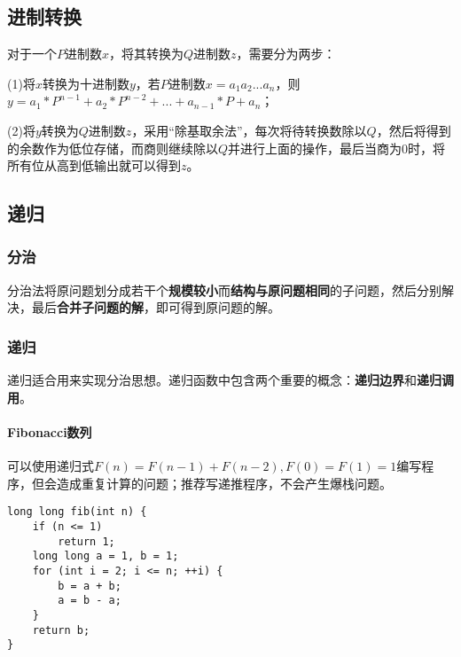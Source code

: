 \subsection{进制转换}

对于一个$P$进制数$x$，将其转换为$Q$进制数$z$，需要分为两步：

(1)将$x$转换为十进制数$y$，若$P$进制数$x=a_1a_2...a_n$，则$y=a_1*P^{n-1}+a_2*P^{n-2}+...+a_{n-1}*P+a_n$；





(2)将$y$转换为$Q$进制数$z$，采用“除基取余法”，每次将待转换数除以$Q$，然后将得到的余数作为低位存储，而商则继续除以$Q$并进行上面的操作，最后当商为0时，将所有位从高到低输出就可以得到$z$。





\subsection{递归}

\subsubsection{分治}

分治法将原问题划分成若干个\textbf{规模较小}而\textbf{结构与原问题相同}的子问题，然后分别解决，最后\textbf{合并子问题的解}，即可得到原问题的解。

\subsubsection{递归}

递归适合用来实现分治思想。递归函数中包含两个重要的概念：\textbf{递归边界}和\textbf{递归调用}。

\paragraph{Fibonacci数列}

可以使用递归式$F(n)=F(n-1)+F(n-2), F(0)=F(1)=1$编写程序，但会造成重复计算的问题；推荐写递推程序，不会产生爆栈问题。

\begin{lstlisting}
long long fib(int n) {
	if (n <= 1)
		return 1;
	long long a = 1, b = 1;
	for (int i = 2; i <= n; ++i) {
		b = a + b;
		a = b - a;
	}
	return b;
}
\end{lstlisting}

